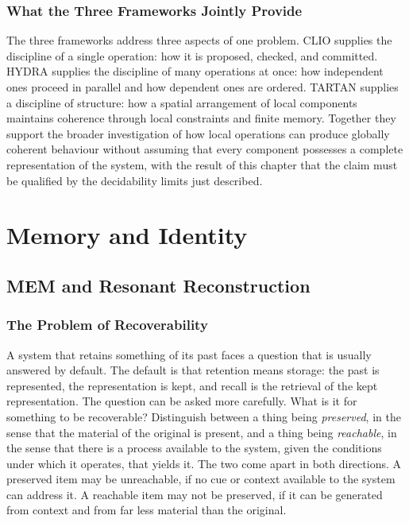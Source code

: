 \documentclass[11pt,twoside,openright]{book}
\theoremstyle{plain}
\theoremstyle{definition}
\theoremstyle{remark}
\newcommand{\memeight}{\mbox{MEM\textbar 8}}
\begin{document}
\section{What the Three Frameworks Jointly Provide}

The three frameworks address three aspects of one problem. CLIO supplies the discipline of a single operation: how it is proposed, checked, and committed. HYDRA supplies the discipline of many operations at once: how independent ones proceed in parallel and how dependent ones are ordered. TARTAN supplies a discipline of structure: how a spatial arrangement of local components maintains coherence through local constraints and finite memory. Together they support the broader investigation of how local operations can produce globally coherent behaviour without assuming that every component possesses a complete representation of the system, with the result of this chapter that the claim must be qualified by the decidability limits just described.
\part{Memory and Identity}

\chapter{\texorpdfstring{\memeight{}}{MEM|8} and Resonant Reconstruction}
\label{ch:mem}

\section{The Problem of Recoverability}

A system that retains something of its past faces a question that is usually answered by default. The default is that retention means storage: the past is represented, the representation is kept, and recall is the retrieval of the kept representation. The question can be asked more carefully. What is it for something to be recoverable? Distinguish between a thing being \emph{preserved}, in the sense that the material of the original is present, and a thing being \emph{reachable}, in the sense that there is a process available to the system, given the conditions under which it operates, that yields it. The two come apart in both directions. A preserved item may be unreachable, if no cue or context available to the system can address it. A reachable item may not be preserved, if it can be generated from context and from far less material than the original.
\end{document}
